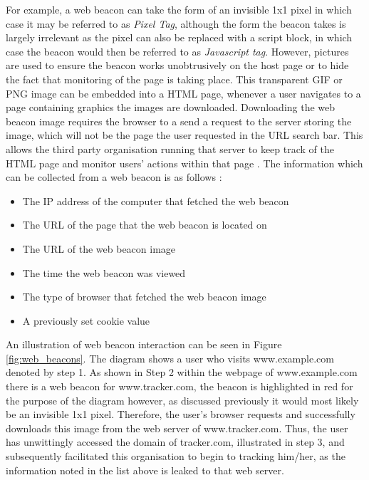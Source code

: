 \documentclass[12pt]{article}
\begin{document}
For example, a web beacon can take the form of an invisible 1x1 pixel in which case it may be referred to as \textit{Pixel Tag}, although the form the beacon takes is largely irrelevant as the pixel can also be replaced with a script block, in which case the beacon would then be referred to as \textit{Javascript tag}. However, pictures are used to ensure the beacon works unobtrusively on the host page or to hide the fact that monitoring of the page is taking place. This transparent GIF or PNG image can be embedded into a HTML page, whenever a user navigates to a page containing graphics the images are downloaded. Downloading the web beacon image requires the browser to a send a request to the server storing the image, which will not be the page the user requested in the URL search bar. This allows the third party organisation running that server to keep track of the HTML page and monitor users' actions within that page \parencite{webBeacons}. The information which can be collected from a web beacon is as follows \parencite{webBug}:

\begin{itemize} \label{}
    \item The IP address of the computer that fetched the web beacon
    \item The URL of the page that the web beacon is located on
    \item The URL of the web beacon image
    \item The time the web beacon was viewed
    \item The type of browser that fetched the web beacon image
    \item A previously set cookie value
\end{itemize}

An illustration of web beacon interaction can be seen in Figure \ref{fig:web_beacons}. The diagram shows a user who visits www.example.com denoted by step 1. As shown in Step 2 within the webpage of www.example.com there is a web beacon for  www.tracker.com, the beacon is highlighted in red for the purpose of the diagram however, as discussed previously it would most likely be an invisible 1x1 pixel. Therefore, the user's browser requests and successfully downloads this image from the web server of www.tracker.com. Thus, the user has unwittingly accessed the domain of tracker.com, illustrated in step 3, and subsequently facilitated this organisation to begin to tracking him/her, as the information noted in the list above is leaked to that web server. 
\end{document}
